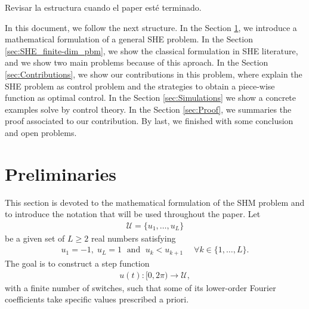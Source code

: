 \documentclass[twocolumn]{autart}    %
\begin{document}
{\color{red} Revisar la estructura cuando el paper est\'e terminado.

In this document, we follow the next structure. In the Section \ref{sec:math_formulation}, we introduce a mathematical formulation of a general SHE problem. 
%
In the Section \ref{sec:SHE_finite-dim_pbm}, we show the classical formulation in SHE literature, and we show two main problems because of this aproach. 
%
In the Section \ref{sec:Contributions}, we show our contributions in this problem, where explain the SHE problem as control problem and the strategies to obtain a piece-wise function as optimal control. 
%
In the Section \ref{sec:Simulations} we show a concrete examples solve by control theory. 
%
In the Section \ref{sec:Proof}, we summaries the proof associated to our contribution. 
%
By last, we finished with some conclusion and open problems. 
}

\section{Preliminaries}\label{sec:math_formulation}

This section is devoted to the mathematical formulation of the SHM problem and to introduce the notation that will be used throughout the paper. Let 
\begin{align}\label{eq:Udef}
	\mathcal{U} = \{u_1, \ldots, u_L\}
\end{align}
be a given set of $L\geq 2$ real numbers satisfying
\begin{align*}
	u_1 = -1, \; u_L = 1 \;\text{ and } \; u_k<u_{k+1} \quad\; \forall k\in \{1,\ldots, L\}.
\end{align*}
The goal is to construct a step function
\begin{align*}
	u(t):[0,2\pi)\to\mathcal U,
\end{align*}
with a finite number of switches, such that some of its lower-order Fourier coefficients take specific values prescribed a priori.
\end{document}
